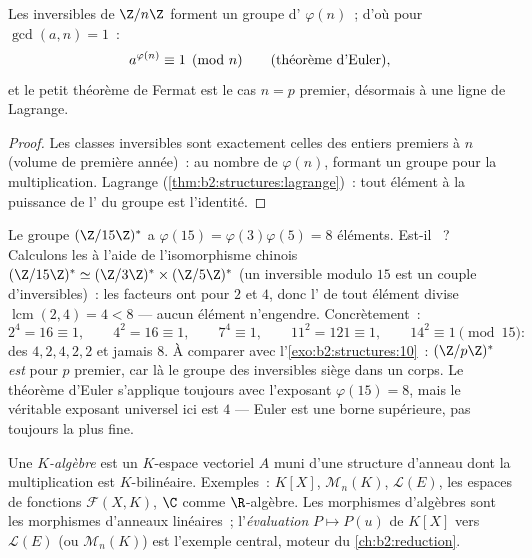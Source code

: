 \begin{theorem}\label{thm:b2:structures:euler}
Les inversibles de $\Z/n\Z$ forment un groupe d' $\varphi(n)$~;
d'où pour $\gcd(a, n) = 1$~:
\[
a^{\varphi(n)} \equiv 1 \pmod n
\qquad (\text{théorème d'Euler}\index{théorème d'Euler}),
\]
et le petit théorème de Fermat est le cas $n = p$ premier, désormais à
une ligne de Lagrange.
\end{theorem}

\begin{proof}
Les classes inversibles sont exactement celles des entiers premiers à
$n$ (volume de première année)~: au nombre de $\varphi(n)$, formant un
groupe pour la multiplication. Lagrange
(\cref{thm:b2:structures:lagrange})~: tout élément à la puissance de
l' du groupe est l'identité.
\end{proof}

\begin{example}\label{ex:b2:structures:units15}
Le groupe $(\Z/15\Z)^*$ a $\varphi(15) = \varphi(3)\varphi(5)
= 8$ éléments. Est-il ~? Calculons les  à l'aide de
l'isomorphisme chinois $(\Z/15\Z)^* \simeq (\Z/3\Z)^* \times
(\Z/5\Z)^*$ (un inversible modulo $15$ est un couple
d'inversibles)~: les facteurs ont pour  $2$ et $4$, donc
l' de tout élément divise $\operatorname{lcm}(2, 4) = 4 < 8$
--- aucun élément n'engendre. Concrètement~:
\[
2^4 = 16 \equiv 1, \qquad
4^2 = 16 \equiv 1, \qquad
7^4 \equiv 1, \qquad
11^2 = 121 \equiv 1, \qquad
14^2 \equiv 1 \pmod{15} :
\]
des  $4, 2, 4, 2, 2$ et jamais $8$. À comparer avec
l'\cref{exo:b2:structures:10}~: $(\Z/p\Z)^*$ \emph{est} 
pour $p$ premier, car là le groupe des inversibles siège dans un
corps. Le théorème d'Euler s'applique toujours avec l'exposant
$\varphi(15) = 8$, mais le véritable exposant universel ici est $4$
--- Euler est une borne supérieure, pas toujours la plus fine.
\end{example}

\begin{definition}[Algèbre]\label{def:b2:structures:algebra}
Une \emph{$K$-algèbre} est un $K$-espace vectoriel $A$
muni d'une structure d'anneau dont la multiplication est
$K$-bilinéaire. Exemples~: $K[X]$, $\mathcal{M}_n(K)$, $\mathcal{L}(E)$,
les espaces de fonctions $\mathcal{F}(X, K)$, $\C$ comme $\R$-algèbre.
Les morphismes d'algèbres sont les morphismes d'anneaux linéaires~;
l'\emph{évaluation} $P \mapsto P(u)$ de $K[X]$ vers $\mathcal{L}(E)$
(ou $\mathcal{M}_n(K)$) est l'exemple central, moteur du
\cref{ch:b2:reduction}.
\end{definition}

